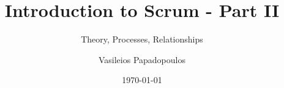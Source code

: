 \documentclass[aspectratio=169,xcolor=dvipsnames,handout]{beamer}
\title[Introduction to Scrum - Part II]{Introduction to Scrum - Part II}
\subtitle{Theory, Processes, Relationships}
\author{Vasileios Papadopoulos}
\institute[]{}
\date{\today}
\begin{document}
    \begin{frame}
    	\titlepage
    \end{frame}

    

    

    

    

    

    
\end{document}
